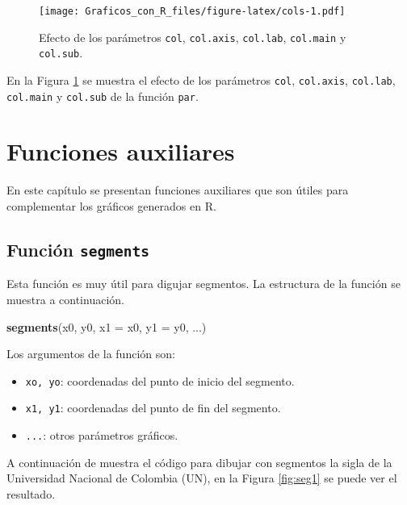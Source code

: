 \documentclass[10pt,]{krantz}
\makeatletter
\newenvironment{Shaded}{\begin{snugshade}}{\end{snugshade}}
\newcommand{\KeywordTok}[1]{\textcolor[rgb]{0.13,0.29,0.53}{\textbf{{#1}}}}
\newcommand{\DataTypeTok}[1]{\textcolor[rgb]{0.13,0.29,0.53}{{#1}}}
\newcommand{\NormalTok}[1]{{#1}}
\providecommand{\tightlist}{%
  \setlength{\itemsep}{0pt}\setlength{\parskip}{0pt}}
\let\proglang=\textsf
\newenvironment{kframe}{%
\medskip{}
\setlength{\fboxsep}{.8em}
 \def\at@end@of@kframe{}%
 \ifinner\ifhmode%
  \def\at@end@of@kframe{\end{minipage}}%
  \begin{minipage}{\columnwidth}%
 \fi\fi%
 \def\FrameCommand##1{\hskip\@totalleftmargin \hskip-\fboxsep
 \colorbox{shadecolor}{##1}\hskip-\fboxsep
     \hskip-\linewidth \hskip-\@totalleftmargin \hskip\columnwidth}%
 \MakeFramed {\advance\hsize-\width
   \@totalleftmargin\z@ \linewidth\hsize
   \@setminipage}}%
 {\par\unskip\endMakeFramed%
 \at@end@of@kframe}
\renewenvironment{Shaded}{\begin{kframe}}{\end{kframe}}
\makeatother
\begin{document}
\begin{figure}[htbp]
\centering
\texttt{[image: Graficos\_con\_R\_files/figure-latex/cols-1.pdf]}
\caption{\label{fig:cols}Efecto de los parámetros \texttt{col},
\texttt{col.axis}, \texttt{col.lab}, \texttt{col.main} y
\texttt{col.sub}.}
\end{figure}

En la Figura \ref{fig:cols} se muestra el efecto de los parámetros
\texttt{col}, \texttt{col.axis}, \texttt{col.lab}, \texttt{col.main} y
\texttt{col.sub} de la función \texttt{par}.

\chapter{Funciones auxiliares}\label{funciones-auxiliares}

En este capítulo se presentan funciones auxiliares que son útiles para
complementar los gráficos generados en \proglang{R}.

\section{\texorpdfstring{Función \texttt{segments} 
}{Función segments  }}\label{funcion-segments}

Esta función es muy útil para digujar segmentos. La estructura de la
función se muestra a continuación.

\begin{Shaded}
\begin{Highlighting}[]
\KeywordTok{segments}\NormalTok{(x0, y0, }\DataTypeTok{x1 =} \NormalTok{x0, }\DataTypeTok{y1 =} \NormalTok{y0, ...)}
\end{Highlighting}
\end{Shaded}

Los argumentos de la función son:

\begin{itemize}
\tightlist
\item
  \texttt{xo,\ yo}: coordenadas del punto de inicio del segmento.
\item
  \texttt{x1,\ y1}: coordenadas del punto de fin del segmento.
\item
  \texttt{...}: otros parámetros gráficos.
\end{itemize}

A continuación de muestra el código para dibujar con segmentos la sigla
de la Universidad Nacional de Colombia (UN), en la Figura \ref{fig:seg1}
se puede ver el resultado.
\end{document}
